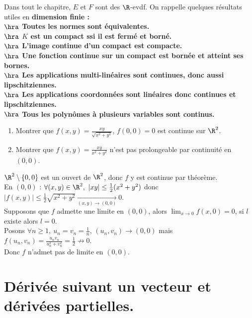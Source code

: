 \documentclass[11pt]{article}
\begin{document}


Dans tout le chapitre, $E$ et $F$ sont des $\R$-evdf. On rappelle quelques résultats utiles en \bf{dimension finie} :\\
$\hra$ Toutes les normes sont équivalentes.\\
$\hra$ $K$ est un compact ssi il est fermé et borné.\\
$\hra$ L'image continue d'un compact est compacte.\\
$\hra$ Une fonction continue sur un compact est bornée et atteint ses bornes.\\
$\hra$ Les applications multi-linéaires sont continues, donc aussi lipschitziennes.\\
$\hra$ Les applications coordonnées sont linéaires donc continues et lipschitziennes.\\
$\hra$ Tous les polynômes à plusieurs variables sont continus.

\begin{exercice}{}{}
    \begin{enumerate}
        \item Montrer que $f(x,y)=\frac{xy}{\sqrt{x^2+y^2}}$, $f(0,0)=0$ est continue sur $\R^2$.
        \item Montrer que $f(x,y)=\frac{xy}{x^2+y^2}$ n'est pas prolongeable par continuité en $(0,0)$.
    \end{enumerate}
    \tcblower
     $\R^2\setminus\{0,0\}$ est un ouvert de $\R^2$, donc $f$ y est continue par théorème.\\
    En $(0,0)$ : $\forall (x,y) \in \R^2, ~ |xy|\leq\frac{1}{2}(x^2+y^2)$ donc $|f(x,y)|\leq\frac{1}{2}\sqrt{x^2+y^2}\xrightarrow[(x,y)\to(0,0)]{}0$.\\
     Supposons que $f$ admette une limite en $(0,0)$, alors $\lim_{x\to0}f(x,0)=0$, si $l$ existe alors $l=0$.\\
    Posons $\forall n \geq 1, ~ u_n=v_n=\frac{1}{n}$, $(u_n,v_n)\to(0,0)$ mais $f(u_n, v_n) = \frac{u_nv_n}{u_n^2+v_n^2}=\frac{1}{2}\not\to0$.\\
    Donc $f$ n'admet pas de limite en $(0,0)$.
\end{exercice}

\vspace*{-0.8cm}

\section{Dérivée suivant un vecteur et dérivées partielles.}
\end{document}
